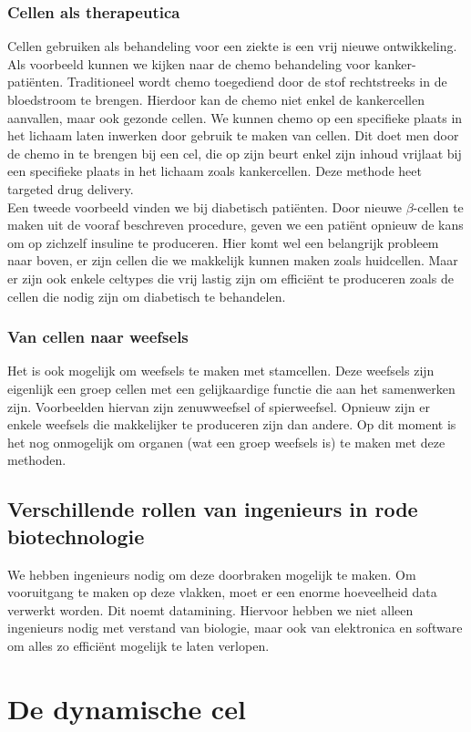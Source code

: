 \documentclass[a4paper,kul]{kulakarticle} %
\begin{document}
\subsubsection{Cellen als therapeutica}
Cellen gebruiken als behandeling voor een ziekte is een vrij nieuwe ontwikkeling. Als voorbeeld kunnen we kijken naar de chemo behandeling voor kanker-patiënten. Traditioneel wordt chemo toegediend door de stof rechtstreeks in de bloedstroom te brengen. Hierdoor kan de chemo niet enkel de kankercellen aanvallen, maar ook gezonde cellen. We kunnen chemo op een specifieke plaats in het lichaam laten inwerken door gebruik te maken van cellen. Dit doet men door de chemo in te brengen bij een cel, die op zijn beurt enkel zijn inhoud vrijlaat bij een specifieke plaats in het lichaam zoals kankercellen. Deze methode heet targeted drug delivery.
\\
Een tweede voorbeeld vinden we bij diabetisch patiënten. Door nieuwe $\beta$-cellen te maken uit de vooraf beschreven procedure, geven we een patiënt opnieuw de kans om op zichzelf insuline te produceren. Hier komt wel een belangrijk probleem naar boven, er zijn cellen die we makkelijk kunnen maken zoals huidcellen. Maar er zijn ook enkele celtypes die vrij lastig zijn om efficiënt te produceren zoals de cellen die nodig zijn om diabetisch te behandelen. 
\subsubsection{Van cellen naar weefsels}
Het is ook mogelijk om weefsels te maken met stamcellen. Deze weefsels zijn eigenlijk een groep cellen met een gelijkaardige functie die aan het samenwerken zijn. Voorbeelden hiervan zijn zenuwweefsel of spierweefsel. Opnieuw zijn er enkele weefsels die makkelijker te produceren zijn dan andere. Op dit moment is het nog onmogelijk om organen (wat een groep weefsels is) te maken met deze methoden. 
\subsection[Ingenieurs in rode biotechnologie]{Verschillende rollen van ingenieurs in rode biotechnologie}
We hebben ingenieurs nodig om deze doorbraken mogelijk te maken. Om vooruitgang te maken op deze vlakken, moet er een enorme hoeveelheid data verwerkt worden. Dit noemt datamining. Hiervoor hebben we niet alleen ingenieurs nodig met verstand van biologie, maar ook van elektronica en software om alles zo efficiënt mogelijk te laten verlopen.  
\section{De dynamische cel}
\end{document}
